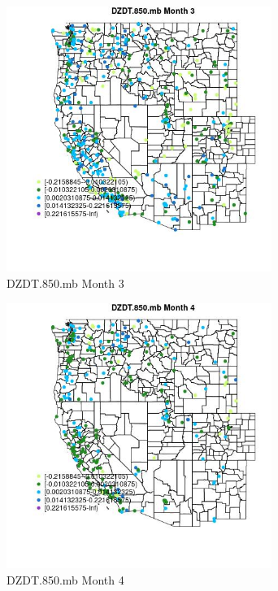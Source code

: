 \begin{figure} 
\centering  
\includegraphics[width=0.77\textwidth]{Code_Outputs/Report_ML_input_PM25_Step4_part_e_de_duplicated_aveswNAs_MapObsMo3DZDT850mb.jpg} 
\caption{\label{fig:Report_ML_input_PM25_Step4_part_e_de_duplicated_aveswNAsMapObsMo3DZDT850mb}DZDT.850.mb Month 3} 
\end{figure} 
 

\clearpage 

\begin{figure} 
\centering  
\includegraphics[width=0.77\textwidth]{Code_Outputs/Report_ML_input_PM25_Step4_part_e_de_duplicated_aveswNAs_MapObsMo4DZDT850mb.jpg} 
\caption{\label{fig:Report_ML_input_PM25_Step4_part_e_de_duplicated_aveswNAsMapObsMo4DZDT850mb}DZDT.850.mb Month 4} 
\end{figure} 
 


